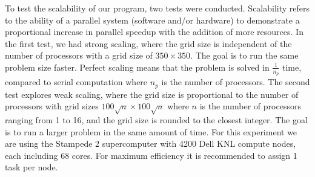 \documentclass[12pt]{article}
\begin{document}
\newline \newline
To test the scalability of our program, two tests were conducted. Scalability refers to the ability of a parallel system (software and/or hardware) to demonstrate a proportional increase in parallel speedup with the addition of more resources.
		 In the first test, we had strong scaling, where the grid size is independent of the number of processors with a grid size of $350 \times 350$. The goal is to run the same problem size faster. Perfect scaling means that the problem is solved in $\frac{1}{n_p}$ time, compared to serial computation where $n_p$ is the number of processors. The second test explores weak scaling, where the grid size is proportional to the number of processors with grid sizes $100 \sqrt{n} \times 100 \sqrt{n}$ where $n$ is the number of processors ranging from 1 to 16, and the grid size is rounded to the closest integer. The goal is to run a larger problem in the same amount of time. For this experiment we are using the Stampede 2 supercomputer with 4200 Dell KNL compute nodes, each including 68 cores. For maximum efficiency it is recommended to assign 1 task per node.
\end{document}
